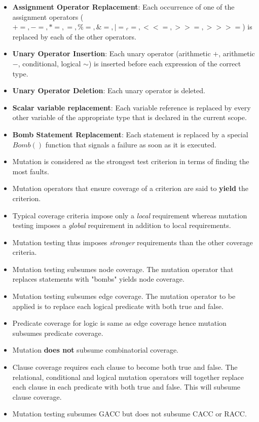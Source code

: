 \documentclass[a4paper]{article}
\begin{document}
\begin{itemize}
    \item \textbf{Assignment Operator Replacement}: Each occurrence of one of the assignment operators ($+=,-=,*=,=,\%=,\&=,\lvert=,\hat{}=,<<=,>>=,>>>=$) is replaced by each of the other operators.
    \item \textbf{Unary Operator Insertion}: Each unary operator (arithmetic $+$, arithmetic $-$, conditional, logical $\sim$) is inserted before each expression of the correct type.
    \item \textbf{Unary Operator Deletion}: Each unary operator is deleted.
    \item \textbf{Scalar variable replacement}: Each variable reference is replaced by every other variable of the appropriate type that is declared in the current scope.
    \item \textbf{Bomb Statement Replacement}: Each statement is replaced by a special $Bomb()$ function that signals a failure as soon as it is executed.
    \item Mutation is considered as the strongest test criterion in terms of finding the most faults.
    \item Mutation operators that ensure coverage of a criterion are said to \textbf{yield} the criterion.
    \item Typical coverage criteria impose only a \textit{local} requirement whereas mutation testing imposes a \textit{global} requirement in addition to local requirements.
    \item Mutation testing thus imposes \textit{stronger} requirements than the other coverage criteria.
    \item Mutation testing subsumes node coverage. The mutation operator that replaces statements with "bombs" yields node coverage.
    \item Mutation testing subsumes edge coverage. The mutation operator to be applied is to replace each logical predicate with both true and false.
    \item Predicate coverage for logic is same as edge coverage hence mutation subsumes predicate coverage.
    \item Mutation \textbf{does not} subsume combinatorial coverage.
    \item Clause coverage requires each clause to become both true and false. The relational, conditional and logical mutation operators will together replace each clause in each predicate with both true and false. This will subsume clause coverage.
    \item Mutation testing subsumes GACC but does not subsume CACC or RACC.

\end{itemize}
\end{document}
